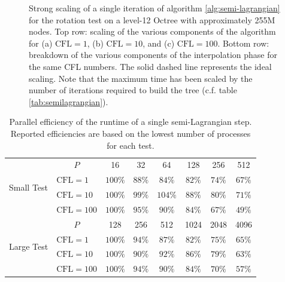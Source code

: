 \begin{figure}[htbp]
\begin{center}
	\end{center}
	\caption{Strong scaling of a single iteration of algorithm \ref{alg:semi-lagrangian} for the rotation test on a level-12 Octree with approximately 255M nodes. Top row: scaling of the various components of the algorithm for (a) $\text{CFL} = 1$, (b) $\text{CFL} = 10$, and (c) $\text{CFL} = 100$. Bottom row: breakdown of the various components of the interpolation phase for the same CFL numbers. The solid dashed line represents the ideal scaling. Note that the maximum time has been scaled by the number of iterations required to build the tree (c.f. table \ref{tab:semilagrangian}).}
	\label{fig:semilagrangian_large}
\end{figure}

\begin{table}
\centering
	\begin{tabular}{|l|l|cccccc|}
	\hline
	\multirow{4}{*}{Small Test} & \multicolumn{1}{|c|}{$P$} & 16      & 32      & 64      & 128     & 256    & 512 \\
	\cline{2-8} 	                            
	                            & $\text{CFL} = 1$   & $100\%$ & $88\%$  & $84\%$  & $82\%$  & $74\%$ & $67\%$ \\
	                            & $\text{CFL} = 10$  & $100\%$ & $99\%$  & $104\%$ & $88\%$  & $80\%$ & $71\%$ \\ 	                            
	                            & $\text{CFL} = 100$ & $100\%$ & $95\%$  & $90\%$  & $84\%$  & $67\%$ & $49\%$ \\
	\hline
	\multirow{4}{*}{Large Test} & \multicolumn{1}{|c|}{$P$} & 128     & 256     & 512     & 1024    & 2048   & 4096 \\
	\cline{2-8} 	                            
	                            & $\text{CFL} = 1$   & $100\%$ & $94\%$  & $87\%$  & $82\%$  & $75\%$ & $65\%$ \\
	                            & $\text{CFL} = 10$  & $100\%$ & $90\%$  & $92\%$  & $86\%$  & $79\%$ & $63\%$ \\
	                            & $\text{CFL} = 100$ & $100\%$ & $94\%$  & $90\%$  & $84\%$  & $70\%$ & $57\%$ \\
	\hline
	\end{tabular}
	\caption{Parallel efficiency of the runtime of a single semi-Lagrangian step. Reported efficiencies are based on the lowest number of processes for each test.}
	\label{tab:scaling_semilagrangian}
\end{table}

